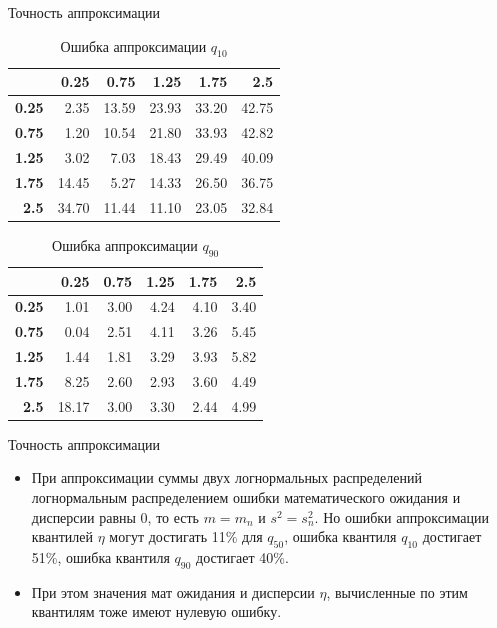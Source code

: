 \documentclass[ucs, notheorems, handout]{beamer}
\begin{document}
\begin{frame}{Точность аппроксимации }
	\begin{table}[ht]
		\centering
		\caption{Ошибка аппроксимации $q_{10}$ }
		\begin{tabular}{rrrrrr}
			\hline
			& \textbf{0.25} & \textbf{0.75} & \textbf{1.25} & \textbf{1.75} & \textbf{2.5} \\
			\hline
			\textbf{0.25} & 2.35 & 13.59 & 23.93 & 33.20 & 42.75 \\ 
			\textbf{0.75} & 1.20 & 10.54 & 21.80 & 33.93 & 42.82 \\ 
			\textbf{1.25} & 3.02 & 7.03 & 18.43 & 29.49 & 40.09 \\ 
			\textbf{1.75} & 14.45 & 5.27 & 14.33 & 26.50 & 36.75 \\ 
			\textbf{2.5} & 34.70 & 11.44 & 11.10 & 23.05 & 32.84 \\ 
			\hline
		\end{tabular}
	\end{table}
	
	\begin{table}[ht]
		\centering
		\caption{Ошибка аппроксимации $q_{90}$ }
		\begin{tabular}{rrrrrr}
			\hline
			& \textbf{0.25} & \textbf{0.75} & \textbf{1.25} & \textbf{1.75} & \textbf{2.5} \\
			\hline
			\textbf{0.25} & 1.01 & 3.00 & 4.24 & 4.10 & 3.40 \\ 
			\textbf{0.75} & 0.04 & 2.51 & 4.11 & 3.26 & 5.45 \\ 
			\textbf{1.25} & 1.44 & 1.81 & 3.29 & 3.93 & 5.82 \\ 
			\textbf{1.75} & 8.25 & 2.60 & 2.93 & 3.60 & 4.49 \\ 
			\textbf{2.5} & 18.17 & 3.00 & 3.30 & 2.44 & 4.99 \\ 
			\hline
		\end{tabular}
	\end{table}
	
\end{frame}

\begin{frame}{Точность аппроксимации }
	\begin{itemize}
		\item При аппроксимации суммы двух логнормальных распределений логнормальным распределением ошибки математического ожидания и дисперсии равны 0, то есть $m=m_{n}$ и $s^{2} = s_{n}^{2}$. Но ошибки аппроксимации квантилей $\eta$ могут достигать 11\% для $q_{50}$, ошибка  квантиля $q_{10}$ достигает 51\%, ошибка квантиля $q_{90}$ достигает 40\%.
		\bigskip
		\item При этом значения мат ожидания и дисперсии $\eta$, вычисленные по этим квантилям тоже имеют нулевую ошибку.
	\end{itemize}	
\end{frame}
\end{document}
